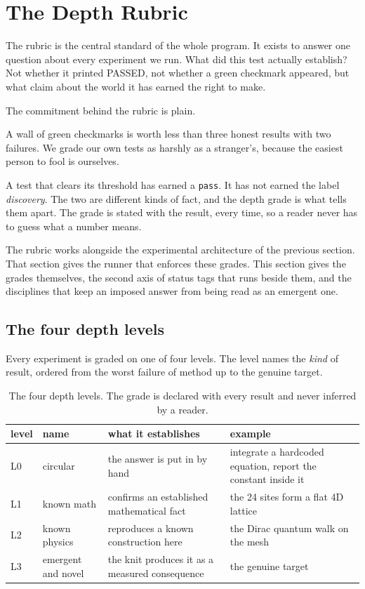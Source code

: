 \section{The Depth Rubric}

The rubric is the central standard of the whole program. It exists to answer one question about every experiment we run. What did this test actually establish? Not whether it printed PASSED, not whether a green checkmark appeared, but what claim about the world it has earned the right to make.

The commitment behind the rubric is plain.

\begin{principle}
A wall of green checkmarks is worth less than three honest results with two failures. We grade our own tests as harshly as a stranger's, because the easiest person to fool is ourselves.
\end{principle}

A test that clears its threshold has earned a \texttt{pass}. It has not earned the label \emph{discovery}. The two are different kinds of fact, and the depth grade is what tells them apart. The grade is stated with the result, every time, so a reader never has to guess what a number means.

The rubric works alongside the experimental architecture of the previous section. That section gives the runner that enforces these grades. This section gives the grades themselves, the second axis of status tags that runs beside them, and the disciplines that keep an imposed answer from being read as an emergent one.

\subsection{The four depth levels}

Every experiment is graded on one of four levels. The level names the \emph{kind} of result, ordered from the worst failure of method up to the genuine target.

\begin{table}[ht]
\centering
\begin{tabular}{@{}llll@{}}
\toprule
level & name & what it establishes & example \\
\midrule
L0 & circular & the answer is put in by hand & integrate a hardcoded equation, report the constant inside it \\
L1 & known math & confirms an established mathematical fact & the 24 sites form a flat 4D lattice \\
L2 & known physics & reproduces a known construction here & the Dirac quantum walk on the mesh \\
L3 & emergent and novel & the knit produces it as a measured consequence & the genuine target \\
\bottomrule
\end{tabular}
\caption{The four depth levels. The grade is declared with every result and never inferred by a reader.}
\label{tab:depth-levels}
\end{table}

